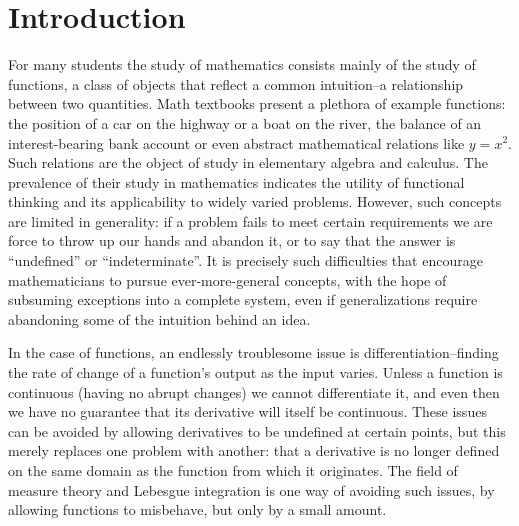 \chapter*{Introduction}

  For many students the study of mathematics consists mainly of the study of functions, a class of objects that reflect a common intuition--a relationship between two quantities.
  Math textbooks present a plethora of example functions: the position of a car on the highway or a boat on the river, the balance of an interest-bearing bank account or even abstract mathematical relations like $y=x^2$.
  Such relations are the object of study in elementary algebra and calculus. 
  The prevalence of their study in mathematics indicates the utility of functional thinking and its applicability to widely varied problems.
  However, such concepts are limited in generality: if a problem fails to meet certain requirements we are force to throw up our hands and abandon it, or to say that the answer is ``undefined'' or ``indeterminate''.
  It is precisely such difficulties that encourage mathematicians to pursue ever-more-general concepts, with the hope of subsuming exceptions into a complete system, even if generalizations require abandoning some of the intuition behind an idea.

  In the case of functions, an endlessly troublesome issue is differentiation--finding the rate of change of a function's output as the input varies.
  Unless a function is continuous (having no abrupt changes) we cannot differentiate it, and even then we have no guarantee that its derivative will itself be continuous.
  These issues can be avoided by allowing derivatives to be undefined at certain points, but this merely replaces one problem with another: that a derivative is no longer defined on the same domain as the function from which it originates.
  The field of measure theory and Lebesgue integration is one way of avoiding such issues, by allowing functions to misbehave, but only by a small amount.

